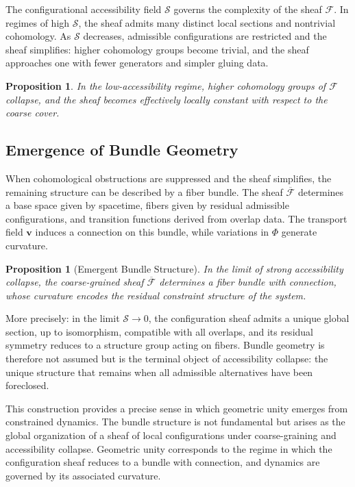 \documentclass[11pt, a4paper, twocolumn]{article}
\newtheorem{proposition}[definition]{Proposition}
\newcommand{\Sfield}{\mathcal{S}}
\begin{document}
The configurational accessibility field $\Sfield$ governs the complexity of
the sheaf $\mathcal{F}$. In regimes of high $\Sfield$, the sheaf admits many
distinct local sections and nontrivial cohomology. As $\Sfield$ decreases,
admissible configurations are restricted and the sheaf simplifies: higher
cohomology groups become trivial, and the sheaf approaches one with fewer
generators and simpler gluing data.

\begin{proposition}
In the low-accessibility regime, higher cohomology groups of $\mathcal{F}$
collapse, and the sheaf becomes effectively locally constant with respect to
the coarse cover.
\end{proposition}

\subsection{Emergence of Bundle Geometry}

When cohomological obstructions are suppressed and the sheaf simplifies, the
remaining structure can be described by a fiber bundle. The sheaf
$\overline{\mathcal{F}}$ determines a base space given by spacetime, fibers
given by residual admissible configurations, and transition functions derived
from overlap data. The transport field $\mathbf{v}$ induces a connection on
this bundle, while variations in $\Phi$ generate curvature.

\begin{proposition}[Emergent Bundle Structure]
In the limit of strong accessibility collapse, the coarse-grained sheaf
$\overline{\mathcal{F}}$ determines a fiber bundle with connection, whose
curvature encodes the residual constraint structure of the system.
\end{proposition}

More precisely: in the limit $\Sfield \to 0$, the configuration sheaf admits
a unique global section, up to isomorphism, compatible with all overlaps, and
its residual symmetry reduces to a structure group acting on fibers. Bundle
geometry is therefore not assumed but is the terminal object of accessibility
collapse: the unique structure that remains when all admissible alternatives
have been foreclosed.

This construction provides a precise sense in which geometric unity emerges
from constrained dynamics. The bundle structure is not fundamental but arises
as the global organization of a sheaf of local configurations under
coarse-graining and accessibility collapse. Geometric unity corresponds to
the regime in which the configuration sheaf reduces to a bundle with
connection, and dynamics are governed by its associated curvature.
\end{document}
